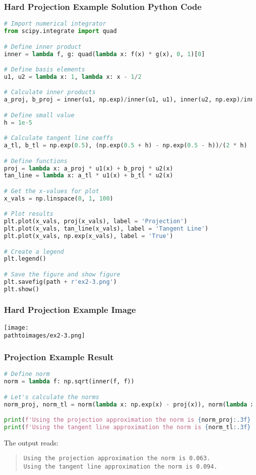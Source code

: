 \documentclass{beamer}
\newcommand{\pathtoimages}{/Users/charlesrambo/Desktop/Bootcamp24/Images}
\begin{document}
\begin{frame}[fragile]
\frametitle{Hard Projection Example Solution Python Code}
\begin{lstlisting}[language=Python]
# Import numerical integrator
from scipy.integrate import quad

# Define inner product
inner = lambda f, g: quad(lambda x: f(x) * g(x), 0, 1)[0]

# Define basis elements
u1, u2 = lambda x: 1, lambda x: x - 1/2 

# Calculate inner products
a_proj, b_proj = inner(u1, np.exp)/inner(u1, u1), inner(u2, np.exp)/inner(u2, u2) 

# Define small value
h = 1e-5

# Calculate tangent line coeffs
a_tl, b_tl = np.exp(0.5), (np.exp(0.5 + h) - np.exp(0.5 - h))/(2 * h)

# Define functions 
proj = lambda x: a_proj * u1(x) + b_proj * u2(x)
tan_line = lambda x: a_tl * u1(x) + b_tl * u2(x)

# Get the x-values for plot
x_vals = np.linspace(0, 1, 100)

# Plot results
plt.plot(x_vals, proj(x_vals), label = 'Projection')
plt.plot(x_vals, tan_line(x_vals), label = 'Tangent Line')
plt.plot(x_vals, np.exp(x_vals), label = 'True')

# Create a legend
plt.legend()

# Save the figure and show figure
plt.savefig(path + r'ex2-3.png')
plt.show()
\end{lstlisting}
\end{frame}

\begin{frame}[fragile]
\frametitle{Hard Projection Example Image}
\begin{center}
\texttt{[image: \\pathtoimages/ex2-3.png]}
\end{center}
\end{frame}

\begin{frame}[fragile]
\frametitle{Projection Example Result}

\begin{lstlisting}[language=Python]
# Define norm
norm = lambda f: np.sqrt(inner(f, f))

# Let's calculate the norms
norm_proj, norm_tl = norm(lambda x: np.exp(x) - proj(x)), norm(lambda x: np.exp(x) - tan_line(x))

print(f'Using the projection approximation the norm is {norm_proj:.3f}.')
print(f'Using the tangent line approximation the norm is {norm_tl:.3f}.')
\end{lstlisting}
The output reads:
\begin{quote}
{
\small
\texttt{Using the projection approximation the norm is 0.063.}\\
\texttt{Using the tangent line approximation the norm is 0.094.}
}
\end{quote}
\end{frame}
\end{document}
